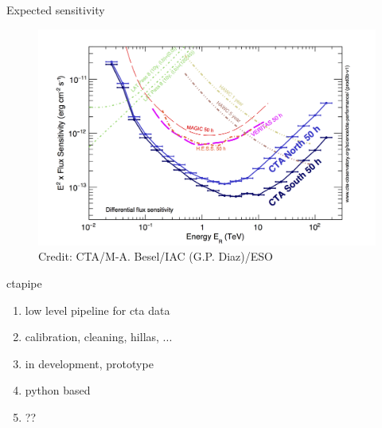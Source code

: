 \begin{frame}{Expected sensitivity}
    \begin{figure}
        \includegraphics[width= 0.8\linewidth]{images/cta_sensitivity.png}
        \caption{Credit: CTA/M-A. Besel/IAC (G.P. Diaz)/ESO}
    \end{figure}

\end{frame}

\begin{frame}{ctapipe}
    \begin{enumerate}
        \item low level pipeline for cta data
        \item calibration, cleaning, hillas, ...
        \item in development, prototype
        \item python based
        \item ??
    \end{enumerate}
\end{frame}
